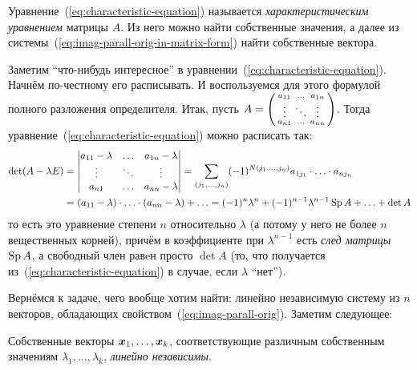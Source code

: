 \documentclass[a4paper,12pt]{article}
\begin{document}
  Уравнение~(\ref{eq:characteristic-equation}) называется \emph{характеристическим уравнением} матрицы $A$.
  Из него можно найти собственные значения, а далее из системы~(\ref{eq:imag-parall-orig-in-matrix-form}) найти собственные вектора.
  
  Заметим ``что-нибудь интересное'' в уравнении~(\ref{eq:characteristic-equation}).
  Начнём по-честному его расписывать.
  И воспользуемся для этого формулой полного разложения определителя.
  Итак, пусть $A \hm= \left(\begin{smallmatrix} a_{11} & \ldots & a_{1n} \\ \vdots & \ddots & \vdots \\ a_{n1} & \ldots & a_{nn}\end{smallmatrix}\right)$.
  Тогда уравнение~(\ref{eq:characteristic-equation}) можно расписать так:
  \begin{equation}
  \begin{split}
    \det(A - \lambda E) &= \begin{vmatrix}
      a_{11} - \lambda & \ldots & a_{1n} - \lambda\\
      \vdots           & \ddots & \vdots\\
      a_{n1}           & \ldots & a_{nn} - \lambda
    \end{vmatrix}
    = \sum_{(j_1, \ldots, j_n)} (-1)^{N(j_1, \ldots, j_n)} a_{1j_1} \cdot \ldots \cdot a_{nj_n}\\
    &= (a_{11} - \lambda) \cdot \ldots \cdot (a_{nn} - \lambda) + \ldots
    = (-1)^n \lambda^n + (-1)^{n-1} \lambda^{n-1} \operatorname{Sp} A + \ldots + \det A
  \end{split}
  \end{equation}
  то есть это уравнение степени $n$ относительно $\lambda$ (а потому у него не более $n$ вещественных корней), причём в коэффициенте при $\lambda^{n-1}$ есть \emph{след матрицы $\operatorname{Sp} A$}, а свободный член равeн просто $\det A$ (то, что получается из~(\ref{eq:characteristic-equation}) в случае, если $\lambda$ ``нет'').
  
  Вернёмся к задаче, чего вообще хотим найти: линейно независимую систему из $n$ векторов, обладающих свойством~(\ref{eq:imag-parall-orig}).
  Заметим следующее:
  
  \begin{proposition}\label{theo:eigenvectors-independent}
    Собственные векторы $\boldsymbol x_1, \ldots, \boldsymbol x_k$, соответствующие различным собственным значениям $\lambda_1, \ldots, \lambda_k$, \emph{линейно независимы}.
  \end{proposition}
  
\end{document}
